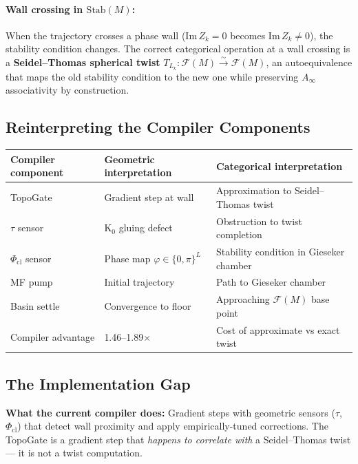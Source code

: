 \documentclass[11pt]{amsart}
\begin{document}
\paragraph{Wall crossing in $\mathrm{Stab}(M)$:}
When the trajectory crosses a phase wall
(Im\,$Z_k = 0$ becomes Im\,$Z_k \neq 0$), the stability condition changes.
The correct categorical operation at a wall crossing is a
\textbf{Seidel--Thomas spherical twist}
$T_{L_k}: \mathcal{F}(M) \xrightarrow{\sim} \mathcal{F}(M)$,
an autoequivalence that maps the old stability condition to the new one
while preserving $A_\infty$ associativity by construction.

\subsection{Reinterpreting the Compiler Components}

\begin{center}\small
\begin{tabular}{@{}lll@{}}
\toprule
Compiler component & Geometric interpretation & Categorical interpretation \\
\midrule
TopoGate & Gradient step at wall & Approximation to Seidel--Thomas twist \\
$\tau$ sensor & K$_0$ gluing defect & Obstruction to twist completion \\
$\Phi_\mathrm{cl}$ sensor & Phase map $\varphi \in \{0,\pi\}^L$ & 
  Stability condition in Gieseker chamber \\
MF pump & Initial trajectory & Path to Gieseker chamber \\
Basin settle & Convergence to floor & Approaching $\mathcal{F}(M)$ base point \\
Compiler advantage & 1.46--1.89$\times$ & Cost of approximate vs exact twist \\
\bottomrule
\end{tabular}
\end{center}

\subsection{The Implementation Gap}

\textbf{What the current compiler does:}
Gradient steps with geometric sensors ($\tau$, $\Phi_\mathrm{cl}$)
that detect wall proximity and apply empirically-tuned corrections.
The TopoGate is a gradient step that \emph{happens to correlate with}
a Seidel--Thomas twist — it is not a twist computation.
\end{document}
